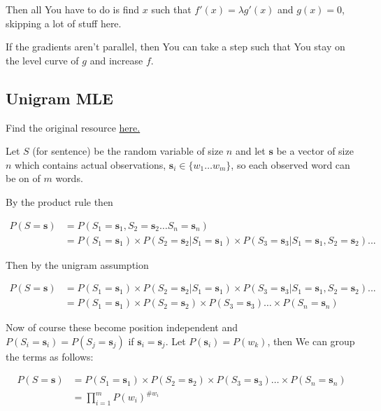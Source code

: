 \documentclass{article}
\begin{document}
		Then all You have to do is find $x$ such that $f'(x) = \lambda g'(x)$ and $g(x)=0$, skipping a lot of stuff here.
		
		If the gradients aren't parallel, then You can take a step such that You stay on the level curve of $g$ and increase $f$.
		
	\subsection{Unigram MLE}
	
		Find the original resource \href{https://leimao.github.io/blog/Maximum-Likelihood-Estimation-Ngram/}{here.}
		
		Let $S$ (for sentence) be the random variable of size $n$ and let $\mathbf{s}$ be a vector of size $n$ which contains actual observations, $\mathbf{s}_i\in\{ w_1\ldots w_m \}$, so each observed word can be on of $m$ words.
		
		By the product rule then
		
		\begin{align}
			P(S=\mathbf{s}) &= P(S_1=\mathbf{s}_1, S_2=\mathbf{s}_2\ldots S_n=\mathbf{s}_n)\\
			&= P(S_1=\mathbf{s}_1)\times P(S_2=\mathbf{s}_2 | S_1=\mathbf{s}_1) \times P(S_3=\mathbf{s}_3 | S_1=\mathbf{s}_1, S_2=\mathbf{s}_2)...
		\end{align}		
			
		Then by the unigram assumption
		
		\begin{align}
			P(S=\mathbf{s}) &= P(S_1=\mathbf{s}_1)\times P(S_2=\mathbf{s}_2 | S_1=\mathbf{s}_1) \times P(S_3=\mathbf{s}_3 | S_1=\mathbf{s}_1, S_2=\mathbf{s}_2)...\\
			&= P(S_1=\mathbf{s}_1)\times P(S_2=\mathbf{s}_2)\times P(S_3=\mathbf{s}_3)\ldots \times P(S_n=\mathbf{s}_n)
		\end{align}
		
		Now of course these become position independent and $P(S_i=\mathbf{s}_i) = P(S_j=\mathbf{s}_j)$ if $\mathbf{s}_i = \mathbf{s}_j$. Let $P(\mathbf{s}_i) = P(w_k)$, then We can group the terms as follows:
		
		\begin{align}
			P(S=\mathbf{s}) &= P(S_1=\mathbf{s}_1)\times P(S_2=\mathbf{s}_2)\times P(S_3=\mathbf{s}_3)\ldots \times P(S_n=\mathbf{s}_n)\\
			&= \prod^m_{i=1} P(w_i)^{\#w_i}
		\end{align}
			
\end{document}
